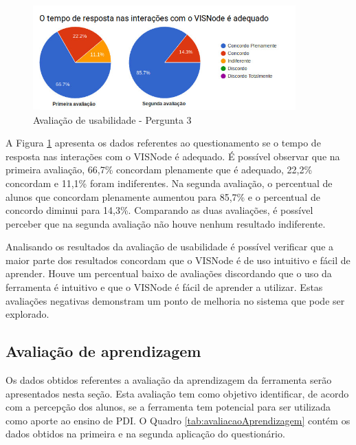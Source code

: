 \documentclass[
	12pt,				%
	oneside,			%
	a4paper,			%
	english,			%
	french,				%
	spanish,			%
	brazil,				%
	]{abntex2}
\begin{document}
\begin{figure}[H]
\centering
\caption{Avaliação de usabilidade - Pergunta 3}\label{fig:avaliacaoUsabilidade3}
\includegraphics[width=0.9\textwidth]{imagens/avaliacoes/avaliacao_usabilidade_3.jpg}
\sourceAuthor
\end{figure}

A Figura \ref{fig:avaliacaoUsabilidade3} apresenta os dados referentes ao questionamento se o tempo de resposta nas interações com o VISNode é adequado. É possível observar que na primeira avaliação, 66,7\%  concordam plenamente que é adequado, 22,2\% concordam e 11,1\% foram indiferentes. Na segunda avaliação, o percentual de alunos que concordam plenamente aumentou para 85,7\% e o percentual de concordo diminui para 14,3\%. Comparando as duas avaliações, é possível perceber que na segunda avaliação não houve nenhum resultado indiferente.

Analisando os resultados da avaliação de usabilidade é possível verificar que a maior parte dos resultados concordam que o VISNode é de uso intuitivo e fácil de aprender. Houve um percentual baixo de avaliações discordando que o uso da ferramenta é intuitivo e que o VISNode é fácil de aprender a utilizar. Estas avaliações negativas demonstram um ponto de melhoria no sistema que pode ser explorado.

\subsection{Avaliação de aprendizagem}

Os dados obtidos referentes a avaliação da aprendizagem da ferramenta serão apresentados nesta seção. Esta avaliação tem como objetivo identificar, de acordo com a percepção dos alunos, se a ferramenta tem potencial para ser utilizada como aporte ao ensino de PDI. O Quadro \ref{tab:avaliacaoAprendizagem} contém os dados obtidos na primeira e na segunda aplicação do questionário. 
\end{document}
